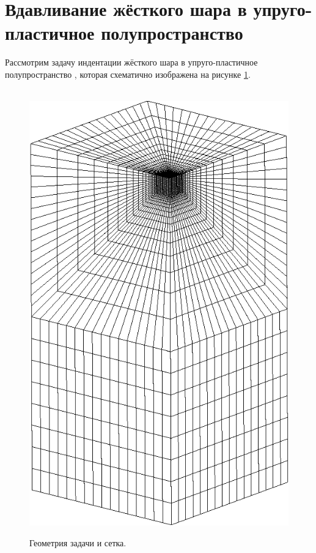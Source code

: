 \documentclass[]{article}
\begin{document}
\section{Вдавливание жёсткого шара в упруго-пластичное полупространство}
Рассмотрим задачу индентации жёсткого шара в упруго-пластичное полупространство \cite{Johnson1989}, которая схематично изображена на рисунке \ref{fig:grid}.

\begin{figure}[h!]
	\centering
	\,\,\,\,\,\,
	\includegraphics[height=0.30\textheight]{pictures/grid.png}
	\caption{Геометрия задачи и сетка.}
	\label{fig:grid}
\end{figure}
\end{document}
